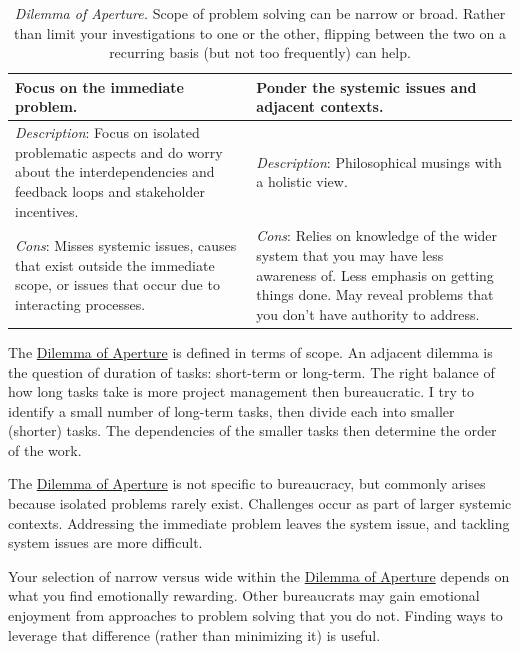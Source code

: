 \begin{center}
\begin{table}[H] %
\begin{tabular}{ | m{\dilemmatablewidth}| m{\dilemmatablewidth} | } 
  \hline
  \textbf{Focus on the immediate problem.} &
  \textbf{Ponder the systemic issues and adjacent contexts.} \\
  \hline
  \textit{Description}: Focus on isolated problematic aspects and do worry about the interdependencies and feedback loops and stakeholder incentives. &
  \textit{Description}: Philosophical musings with a holistic view. \\
  \hline
  \textit{Cons}: Misses systemic issues, causes that exist outside the immediate scope, or issues that occur due to interacting processes. & 
  \textit{Cons}: Relies on knowledge of the wider system that you may have less awareness of. Less emphasis on getting things done. May reveal problems that you don't have authority to address. \\
  \hline
\end{tabular}
\caption{
\textit{Dilemma of Aperture.}
Scope of problem solving can be narrow or broad. Rather than limit your investigations to one or the other, flipping between the two on a recurring basis (but not too frequently) can help.
}
\label{table:focus-vs-systemic}
\end{table}
\end{center}

The \href{table:focus-vs-systemic}{Dilemma of Aperture} is defined in terms of scope. An adjacent dilemma is the question of duration of tasks: short-term or long-term. The right balance of how long tasks take is more project management then bureaucratic. I try to identify a small number of long-term tasks, then divide each into smaller (shorter) tasks. The dependencies of the smaller tasks then determine the order of the work.

The \href{table:focus-vs-systemic}{Dilemma of Aperture} is not specific to bureaucracy, but commonly arises because isolated problems rarely exist. Challenges occur as part of larger systemic contexts. Addressing the immediate problem leaves the system issue, and tackling system issues are more difficult. 

Your selection of narrow versus wide within the \href{table:focus-vs-systemic}{Dilemma of Aperture} depends on what you find emotionally rewarding. Other bureaucrats may gain emotional enjoyment from approaches to problem solving that you do not. Finding ways to leverage that difference (rather than minimizing it) is useful. 

